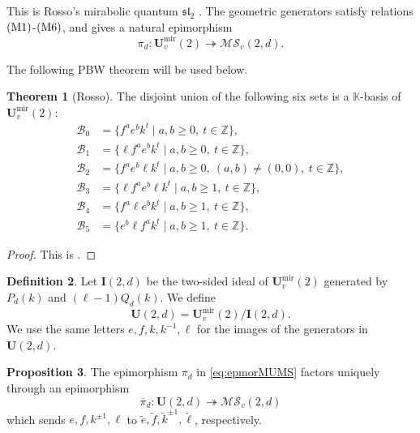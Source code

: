 \documentclass[12pt]{amsart}
\numberwithin{equation}{section}
\theoremstyle{definition}
\newtheorem{theorem}{Theorem}[section]
\newtheorem{proposition}[theorem]{Proposition}
\theoremstyle{definition}
\newtheorem{definition}[theorem]{Definition}
\newcommand{\kk}{\mathbb K}
\newcommand{\Umir}{\mathbf U^{\mathrm{mir}}_v(2)}
\newcommand{\Ufd}{\mathbf U(2,d)}
\newcommand{\MS}{\mathcal{MS}_v(2,d)}
\newcommand{\te}{\widetilde e}
\newcommand{\tf}{\widetilde f}
\newcommand{\tk}{\widetilde k}
\newcommand{\tell}{\widetilde\ell}
\newcommand{\Ifd}{\mathbf{I}(2,d)}
\begin{document}
This is Rosso's mirabolic quantum $\mathfrak{sl}_2$ \cite[Definition~4.1]{Ros18}. The geometric generators satisfy relations $\textup{(M1)}$-$\textup{(M6)}$, and  \cite[Theorem~3.5 \& Proposition 3.6]{Ros18} gives a natural epimorphism
\begin{equation}\label{eq:epmorMUMS}
    \pi_d:\Umir\twoheadrightarrow\MS.
\end{equation}

The following PBW theorem will be used below.

\begin{theorem}[Rosso]\label{thm:pbw}
The disjoint union of the following six sets is a $\kk$-basis of $\Umir$:
$$
\begin{aligned}
\mathcal B_0&=\{f^ae^bk^t\mid a,b\ge0,\ t\in\mathbb Z\},\\
\mathcal B_1&=\{\ell f^ae^bk^t\mid a,b\ge0,\ t\in\mathbb Z\},\\
\mathcal B_2&=\{f^ae^b\ell k^t\mid a,b\ge0,\ (a,b)\ne(0,0),\ t\in\mathbb Z\},\\
\mathcal B_3&=\{\ell f^ae^b\ell k^t\mid a,b\ge1,\ t\in\mathbb Z\},\\
\mathcal B_4&=\{f^a\ell e^bk^t\mid a,b\ge1,\ t\in\mathbb Z\},\\
\mathcal B_5&=\{e^b\ell f^ak^t\mid a,b\ge1,\ t\in\mathbb Z\}.
\end{aligned}
$$
\end{theorem}

\begin{proof}
This is \cite[Proposition~4.4 and Theorem~4.7]{Ros18}.
\end{proof}

\begin{definition}\label{def:Ufd}
Let $\Ifd$ be the two-sided ideal of $\Umir$ generated by $P_d(k)$ and $(\ell-1)Q_d(k)$. We define
$$
\Ufd=\Umir/\Ifd.
$$
We use the same letters $e,f,k,k^{-1},\ell$ for the images of the generators in $\Ufd$.
\end{definition}

\begin{proposition}\label{prop:factor}
The epimorphism $\pi_d$ in \eqref{eq:epmorMUMS} factors uniquely through an epimorphism
\begin{equation}\label{eq:factorMUMS}
    \overline\pi_d:\Ufd\twoheadrightarrow\MS
\end{equation}
which sends $e,f,k^{\pm 1},\ell$ to $\te,\tf,{\tk}^{\pm 1},\tell$, respectively.
\end{proposition}
\end{document}
